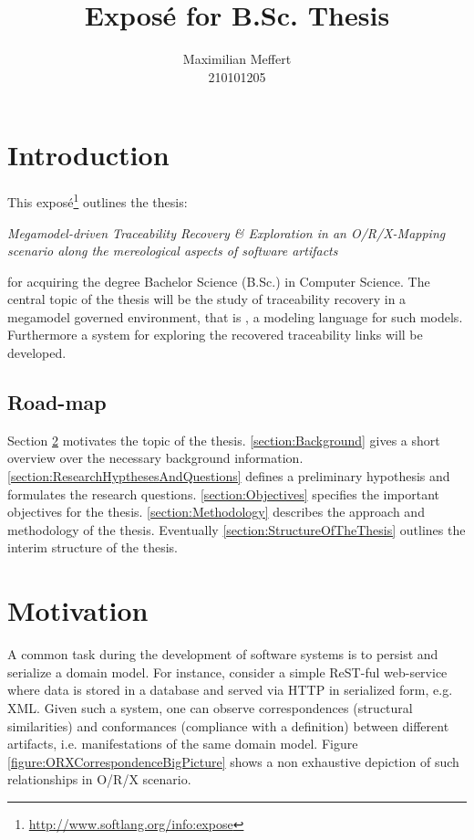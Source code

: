 \documentclass[runningheads,a4paper]{llncs}
\title{Exposé for B.Sc. Thesis}
\subtitle{\thesis}
\author{Maximilian Meffert\\210101205}
\institute{University of Koblenz-Landau}
\newcommand{\megal}{\text{MegaL}}
\newcommand{\thesis}{Megamodel-driven Traceability Recovery \& Exploration in an O/R/X-Mapping scenario along the mereological aspects of software artifacts}
\begin{document}
\maketitle
%


\section{Introduction}
This exposé\footnote{\url{http://www.softlang.org/info:expose}} outlines the thesis:
\begin{center}
\it
\thesis
\end{center}
for acquiring the degree Bachelor Science (B.Sc.) in Computer Science.
The central topic of the thesis will be the study of traceability recovery in a megamodel governed environment, that is \megal, a modeling language for such models. Furthermore a system for exploring the recovered traceability links will be developed.

\subsection{Road-map}
Section \ref{section:Motivation} motivates the topic of the thesis.
\ref{section:Background} gives a short overview over the necessary background information.
\ref{section:ResearchHypthesesAndQuestions} defines a preliminary hypothesis and formulates the research questions.
\ref{section:Objectives} specifies the important objectives for the thesis.
\ref{section:Methodology} describes the approach and methodology of the thesis.
Eventually \ref{section:StructureOfTheThesis} outlines the interim structure of the thesis.


\section{Motivation}
\label{section:Motivation}
A common task during the development of software systems is to persist and serialize a domain model.
For instance, consider a simple ReST-ful web-service where data is stored in a database and served via HTTP in serialized form, e.g. XML.
Given such a system, one can observe correspondences (structural similarities) and conformances (compliance with a definition) between different artifacts, i.e. manifestations of the same domain model.
Figure \ref{figure:ORXCorrespondenceBigPicture} shows a non exhaustive depiction of such relationships in O/R/X scenario.
\end{document}
